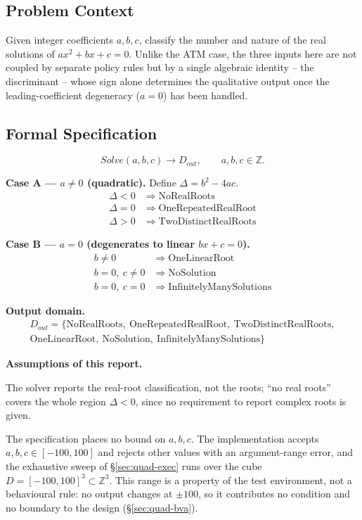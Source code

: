 \documentclass[11pt,a4paper]{article}
\begin{document}
\subsection{Problem Context}
\label{sec:quad-context}
Given integer coefficients \(a,b,c\), classify the number and nature of the
real solutions of \(ax^2+bx+c=0\). Unlike the ATM case, the three inputs here
are not coupled by separate policy rules but by a single algebraic identity
-- the discriminant -- whose sign alone determines the qualitative output
once the leading-coefficient degeneracy (\(a=0\)) has been handled.

\subsection{Formal Specification}
\label{sec:quad-spec}
\[
\mathit{Solve}(a,b,c) \to D_{out}, \qquad a,b,c\in\mathbb{Z}.
\]

\textbf{Case A --- \(a\ne 0\) (quadratic).} Define \(\Delta = b^2-4ac\).
\begin{align}
\Delta<0 &\Rightarrow \mathrm{NoRealRoots}\\
\Delta=0 &\Rightarrow \mathrm{OneRepeatedRealRoot}\\
\Delta>0 &\Rightarrow \mathrm{TwoDistinctRealRoots}
\end{align}

\textbf{Case B --- \(a=0\) (degenerates to linear \(bx+c=0\)).}
\begin{align}
b\ne 0 &\Rightarrow \mathrm{OneLinearRoot}\\
b=0,\ c\ne 0 &\Rightarrow \mathrm{NoSolution}\\
b=0,\ c=0 &\Rightarrow \mathrm{InfinitelyManySolutions}
\end{align}

\textbf{Output domain.}
\begin{multline*}
D_{out}=\{\mathrm{NoRealRoots},\ \mathrm{OneRepeatedRealRoot},\
\mathrm{TwoDistinctRealRoots},\\
\mathrm{OneLinearRoot},\ \mathrm{NoSolution},\
\mathrm{InfinitelyManySolutions}\}
\end{multline*}

\textbf{Assumptions of this report.}
\begin{description}[style=nextline,leftmargin=1.2em]
    \item[(QS1) Classification only.] The solver reports the real-root
    classification, not the roots; ``no real roots'' covers the whole region
    \(\Delta<0\), since no requirement to report complex roots is given.
    \item[(QS2) Test range.] The specification places no bound on
    \(a,b,c\). The implementation accepts \(a,b,c\in[-100,100]\) and rejects
    other values with an argument-range error, and the exhaustive sweep of
    \S\ref{sec:quad-exec} runs over the cube
    \(D=[-100,100]^3\subset\mathbb{Z}^3\). This range is a property of the
    test environment, not a behavioural rule: no output changes at
    \(\pm100\), so it contributes no condition and no boundary to the design
    (\S\ref{sec:quad-bva}).
\end{description}
\end{document}
